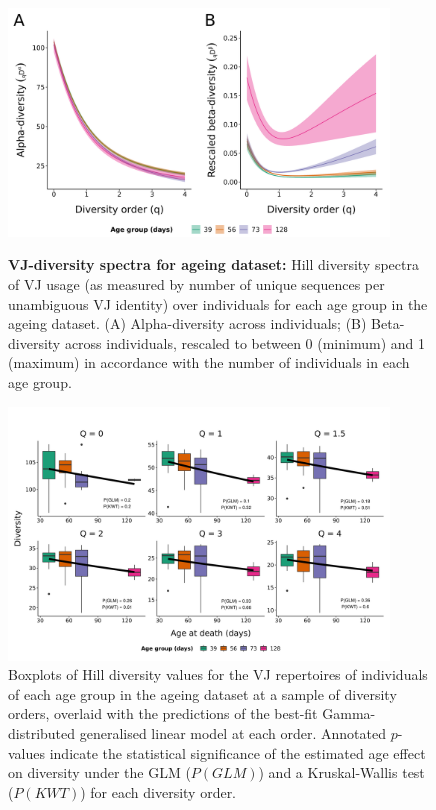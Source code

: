 \begin{figure}
\centering
\includegraphics[width = 0.9\textwidth]{_Figures/png/ageing-VJ-diversity-alpha-beta}
\begin{subfigure}{0em}
\label{fig:igseq-ageing-VJ-diversity-alpha}
\end{subfigure}
\begin{subfigure}{0em}
\label{fig:igseq-ageing-VJ-diversity-beta}
\end{subfigure}
\caption{\textbf{VJ-diversity spectra for ageing dataset:} Hill diversity spectra of VJ usage (as measured by number of unique sequences per unambiguous VJ identity) over individuals for each age group in the \igseq ageing dataset. (A) Alpha-diversity across individuals; (B) Beta-diversity across individuals, rescaled to between 0 (minimum) and 1 (maximum) in accordance with the number of individuals in each age group.}
\label{fig:igseq-ageing-VJ-diversity-spectra}
\end{figure}

\begin{figure}
\centering
\includegraphics[width = 0.9\textwidth]{_Figures/png/ageing-VJ-diversity-solo-fit-gamma}
\caption{Boxplots of Hill diversity values for the VJ repertoires of individuals of each age group in the \igseq ageing dataset at a sample of diversity orders, overlaid with the predictions of the best-fit Gamma-distributed generalised linear model at each order.  Annotated $p$-values indicate the statistical significance of the estimated age effect on diversity under the GLM ($P(GLM)$) and a Kruskal-Wallis test ($P(KWT)$) for each diversity order.}
\label{fig:igseq-ageing-VJ-diversity-solo-fit-gamma}
\end{figure}

